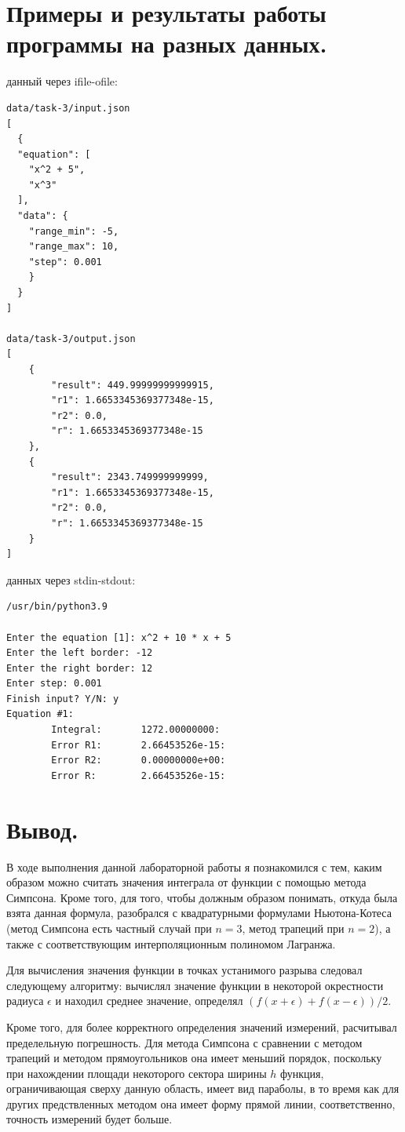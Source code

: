 \documentclass[11pt, a4paper]{article}
\begin{document}
\newpage
\section{Примеры и результаты работы программы на разных данных.}

 данный через ifile-ofile:
\begin{verbatim}
data/task-3/input.json
[
  {
  "equation": [
    "x^2 + 5",
    "x^3"
  ],
  "data": {
    "range_min": -5,
    "range_max": 10,
    "step": 0.001
    }
  }
]

data/task-3/output.json
[
    {
        "result": 449.99999999999915,
        "r1": 1.6653345369377348e-15,
        "r2": 0.0,
        "r": 1.6653345369377348e-15
    },
    {
        "result": 2343.749999999999,
        "r1": 1.6653345369377348e-15,
        "r2": 0.0,
        "r": 1.6653345369377348e-15
    }
]
\end{verbatim}

\bigskip
{} данных через stdin-stdout:
\begin{verbatim}
/usr/bin/python3.9 

Enter the equation [1]: x^2 + 10 * x + 5
Enter the left border: -12
Enter the right border: 12
Enter step: 0.001
Finish input? Y/N: y
Equation #1:
        Integral:       1272.00000000:
        Error R1:       2.66453526e-15:
        Error R2:       0.00000000e+00:
        Error R:        2.66453526e-15:

\end{verbatim}

\section{Вывод.}

В ходе выполнения данной лабораторной работы я познакомился с тем, каким образом можно 
считать значения интеграла от функции с помощью метода Симпсона. Кроме того, для того, чтобы
должным образом понимать, откуда была взята данная формула, разобрался с квадратурными формулами
Ньютона-Котеса (метод Симпсона есть частный случай при $n=3$, метод трапеций при $n = 2$), а также
с соответствующим интерполяционным полиномом Лагранжа.

\medskip
Для вычисления значения функции в точках устанимого разрыва следовал следующему алгоритму: 
вычислял значение функции в некоторой окрестности радиуса $\epsilon$ и находил среднее значение, определял $(f(x + \epsilon) 
+ f(x - \epsilon)) / 2$. 

\medskip
Кроме того, для более корректного определения значений измерений, расчитывал пределельную погрешность.
Для метода Симпсона с сравнении с методом трапеций и методом прямоугольников она имеет меньший порядок,
поскольку при нахождении площади некоторого сектора ширины $h$ функция, ограничивающая сверху данную
область, имеет вид параболы, в то время как для других предствленных методом она имеет форму прямой 
линии, соответственно, точность измерений будет больше.
\end{document}
